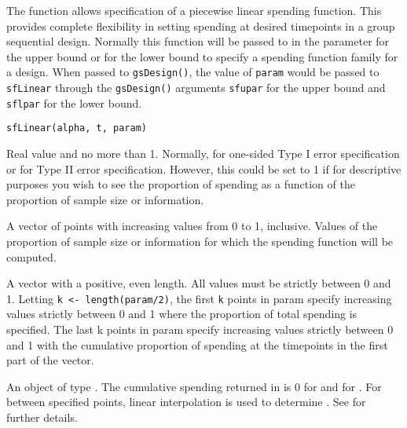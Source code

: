 \begin{Description}\relax
The function  allows specification of a piecewise linear spending function.
This provides complete flexibility in setting spending at desired timepoints in a group sequential design.
Normally this function will be passed to  in the parameter 
 for the upper bound or
 for the lower bound to specify a spending function family for a design.
When passed to \texttt{gsDesign()}, the value of \texttt{param} would be passed to \texttt{sfLinear} through the \texttt{gsDesign()} arguments \texttt{sfupar} for the upper bound and \texttt{sflpar} for the lower bound.
\end{Description}
\begin{Usage}
\begin{verbatim}
sfLinear(alpha, t, param)
\end{verbatim}
\end{Usage}
\begin{Arguments}
\begin{ldescription}
\item[\code{alpha}] Real value  and no more than 1. Normally, 
 for one-sided Type I error specification
or  for Type II error specification. However, this could be set to 1 if for descriptive purposes you wish to see the proportion of spending as a function of the proportion of sample size or information.
\item[\code{t}] A vector of points with increasing values from 0 to 1, inclusive. Values of the proportion of 
sample size or information for which the spending function will be computed.
\item[\code{param}] A vector with a positive, even length. All values must be strictly between 0 and 1.
Letting \texttt{k <- length(param/2)}, the first \texttt{k} points in param specify increasing values strictly between 0 and 1 where the proportion of total spending is specified. 
The last k points in param specify increasing values strictly between 0 and 1 with the cumulative proportion of spending at the timepoints in the first part of the vector.
\end{ldescription}
\end{Arguments}
\begin{Value}
An object of type . 
The cumulative spending returned in  is 0 for  and  for . 
For  between specified points, linear interpolation is used to determine . 
See  for further details.
\end{Value}
